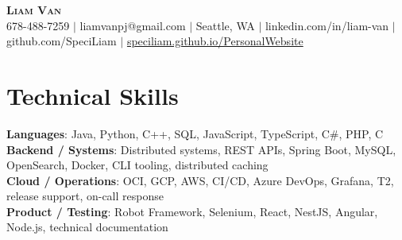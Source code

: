 \documentclass[letterpaper,11pt]{article}
\begin{document}

%
\begin{center}
    \textbf{\Huge \scshape Liam Van} \\ \vspace{1pt}
    \small 678-488-7259 $|$ \small {liamvanpj@gmail.com} $|$ Seattle, WA
 {{$|$ linkedin.com/in/liam-van} {$|$ github.com/SpeciLiam} {$|$ \href{https://speciliam.github.io/PersonalWebsite}{speciliam.github.io/PersonalWebsite}}}

\end{center}

\section{Technical Skills}
 \begin{itemize}[leftmargin=0.15in, label={}]
    \small{\item{
     \textbf{Languages}{: Java, Python, C++, SQL, JavaScript, TypeScript, C\#, PHP, C} \\
     \textbf{Backend / Systems}{: Distributed systems, REST APIs, Spring Boot, MySQL, OpenSearch, Docker, CLI tooling, distributed caching} \\
     \textbf{Cloud / Operations}{: OCI, GCP, AWS, CI/CD, Azure DevOps, Grafana, T2, release support, on-call response} \\
     \textbf{Product / Testing}{: Robot Framework, Selenium, React, NestJS, Angular, Node.js, technical documentation} \\
    }}
 \end{itemize}
%
\end{document}
